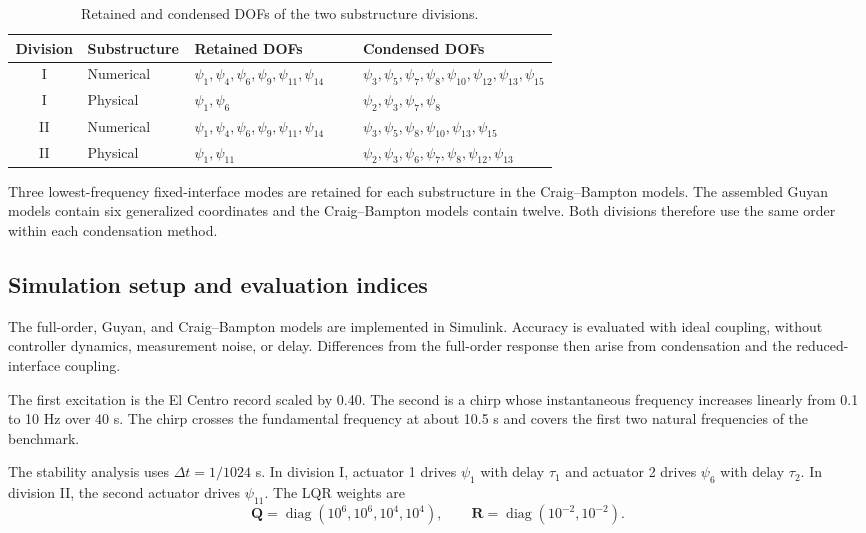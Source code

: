 \documentclass[11pt]{article}
\newenvironment{revision}{\begingroup\color{red}}{\endgroup}
\begin{document}
\begin{table}[H]
\centering
\caption{Retained and condensed DOFs of the two substructure divisions.}
\label{tab:dofsets}
\small
\begin{tabular}{clp{0.31\linewidth}p{0.36\linewidth}}
\toprule
Division & Substructure & Retained DOFs & Condensed DOFs\\
\midrule
I & Numerical & $\psi_1,\psi_4,\psi_6,\psi_9,\psi_{11},\psi_{14}$ & $\psi_3,\psi_5,\psi_7,\psi_8,\psi_{10},\psi_{12},\psi_{13},\psi_{15}$\\
I & Physical & $\psi_1,\psi_6$ & $\psi_2,\psi_3,\psi_7,\psi_8$\\
II & Numerical & $\psi_1,\psi_4,\psi_6,\psi_9,\psi_{11},\psi_{14}$ & $\psi_3,\psi_5,\psi_8,\psi_{10},\psi_{13},\psi_{15}$\\
II & Physical & $\psi_1,\psi_{11}$ & $\psi_2,\psi_3,\psi_6,\psi_7,\psi_8,\psi_{12},\psi_{13}$\\
\bottomrule
\end{tabular}
\end{table}

Three lowest-frequency fixed-interface modes are retained for each substructure in the Craig--Bampton models. The assembled Guyan models contain six generalized coordinates and the Craig--Bampton models contain twelve. Both divisions therefore use the same order within each condensation method.

\subsection{Simulation setup and evaluation indices}\label{sec:setup}

\begin{revision}
The full-order, Guyan, and Craig--Bampton models are implemented in Simulink. Accuracy is evaluated with ideal coupling, without controller dynamics, measurement noise, or delay. Differences from the full-order response then arise from condensation and the reduced-interface coupling.
\end{revision}

The first excitation is the El Centro record scaled by 0.40. The second is a chirp whose instantaneous frequency increases linearly from 0.1 to 10 Hz over 40 s. The chirp crosses the fundamental frequency at about 10.5 s and covers the first two natural frequencies of the benchmark.

The stability analysis uses \(\Delta t=1/1024\) s. In division I, actuator 1 drives \(\psi_1\) with delay \(\tau_1\) and actuator 2 drives \(\psi_6\) with delay \(\tau_2\). In division II, the second actuator drives \(\psi_{11}\). The LQR weights are
\begin{equation}
    \mathbf{Q}=\operatorname{diag}(10^6,10^6,10^4,10^4),
    \qquad
    \mathbf{R}=\operatorname{diag}(10^{-2},10^{-2}).
    \label{eq:lqr-weights}
\end{equation}
\end{document}
